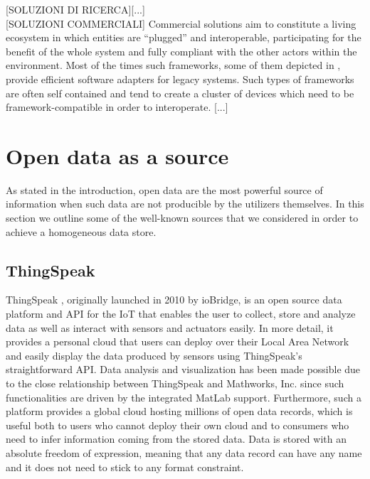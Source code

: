 \documentclass[conference]{IEEEtran}
\begin{document}
[SOLUZIONI DI RICERCA][...]
\\

[SOLUZIONI COMMERCIALI]
Commercial solutions aim to constitute a living ecosystem in which entities are ``plugged'' and interoperable, participating for the benefit of the whole system and fully compliant with the other actors within the environment.
Most of the times such frameworks, some of them depicted in \cite{derhamy2015survey}, provide efficient software adapters for legacy systems.
Such types of frameworks are often self contained and tend to create a cluster of devices which need to be framework-compatible in order to interoperate.
[...]



\section{Open data as a source}

As stated in the introduction, open data are the most powerful source of information when such data are not producible by the utilizers themselves.
In this section we outline some of the well-known sources that we considered in order to achieve a homogeneous data store.

\subsection*{ThingSpeak}
ThingSpeak \cite{thingspeak}, originally launched in 2010 by ioBridge, is an open source data platform and API for the IoT that enables the user to collect, store and analyze data as well as interact with sensors and actuators easily.
In more detail, it provides a personal cloud that users can deploy over their Local Area Network and easily display the data produced by sensors using ThingSpeak's straightforward API.
Data analysis and visualization has been made possible due to the close relationship between ThingSpeak and Mathworks, Inc. since such functionalities are driven by the integrated MatLab support. 
Furthermore, such a platform provides a global cloud hosting millions of open data records, which is useful both to users who cannot deploy their own cloud and to consumers who need to infer information coming from the stored data.
Data is stored with an absolute freedom of expression, meaning that any data record can have any name and it does not need to stick to any format constraint.
\end{document}
